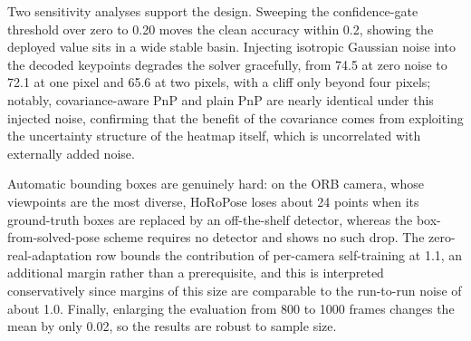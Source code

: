 Two sensitivity analyses support the design. Sweeping the confidence-gate threshold over zero to 0.20 moves the clean accuracy within 0.2, showing the deployed value sits in a wide stable basin. Injecting isotropic Gaussian noise into the decoded keypoints degrades the solver gracefully, from 74.5 at zero noise to 72.1 at one pixel and 65.6 at two pixels, with a cliff only beyond four pixels; notably, covariance-aware PnP and plain PnP are nearly identical under this injected noise, confirming that the benefit of the covariance comes from exploiting the uncertainty structure of the heatmap itself, which is uncorrelated with externally added noise.

Automatic bounding boxes are genuinely hard: on the ORB camera, whose viewpoints are the most diverse, HoRoPose loses about 24 points when its ground-truth boxes are replaced by an off-the-shelf detector, whereas the box-from-solved-pose scheme requires no detector and shows no such drop. The zero-real-adaptation row bounds the contribution of per-camera self-training at 1.1, an additional margin rather than a prerequisite, and this is interpreted conservatively since margins of this size are comparable to the run-to-run noise of about 1.0. Finally, enlarging the evaluation from 800 to 1000 frames changes the mean by only 0.02, so the results are robust to sample size.

